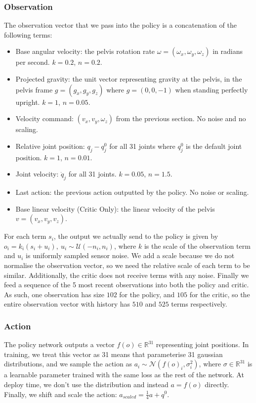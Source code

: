 \documentclass[11pt]{article}
\begin{document}
\subsubsection*{Observation}
The observation vector that we pass into the policy is a concatenation of the following terms:
\begin{itemize}
    \item Base angular velocity: the pelvis rotation rate $\omega = (\omega_x, \omega_y, \omega_z)$ in radians per second. $k=0.2$, $n=0.2$.
    \item Projected gravity: the unit vector representing gravity at the pelvis, in the pelvis frame $g=(g_x, g_y, g_z)$ where $g=(0, 0, -1)$ when standing perfectly upright. $k=1$, $n=0.05$.
    \item Velocity command: $(v_x, v_y,\omega_z)$ from the previous section. No noise and no scaling.
    \item Relative joint position: $q_j-q_j^0$ for all 31 joints where $q_j^0$ is the default joint position. $k=1$, $n=0.01$.
    \item Joint velocity: $\dot{q}_j$ for all 31 joints. $k=0.05$, $n=1.5$.
    \item Last action: the previous action outputted by the policy. No noise or scaling.
    \item Base linear velocity (Critic Only): the linear velocity of the pelvis $v=(v_x, v_y,v_z)$.
\end{itemize}
For each term $s_i$, the output we actually send to the policy is given by $o_i = k_i (s_i + u_i), \ u_i \sim \mathcal{U}(-n_i, n_i)$, where $k$ is the scale of the observation term and $u_i$ is uniformly sampled sensor noise. We add a scale because we do not normalise the observation vector, so we need the relative scale of each term to be similar. Additionally, the critic does not receive terms with any noise. Finally we feed a sequence of the 5 most recent observations into both the policy and critic. As such, one observation has size $102$ for the policy, and $105$ for the critic, so the entire observation vector with history has $510$ and $525$ terms respectively.
\subsubsection*{Action}
The policy network outputs a vector $f(o) \in \mathbb{R}^{31}$ representing joint positions. In training, we treat this vector as 31 means that parameterise 31 gaussian distributions, and we sample the action as $a_i \sim \mathcal{N}(f(o)_i, \sigma_i^2)$, where $\sigma \in \mathbb{R}^{31}$ is a learnable parameter trained with the same loss as the rest of the network. At deploy time, we don't use the distribution and instead $a=f(o)$ directly. Finally, we shift and scale the action: $a_{scaled}=\frac{1}{4}a + q^0$.
\end{document}
